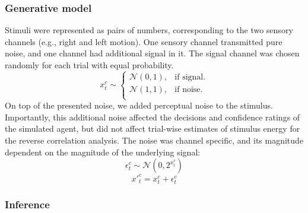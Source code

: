 \documentclass[12pt,twoside]{reedthesis}
\begin{document}
\hypertarget{generative-model}{%
\subsubsection*{Generative model}\label{generative-model}}

Stimuli were represented as pairs of numbers, corresponding to the two sensory channels (e.g., right and left motion). One sensory channel transmitted pure noise, and one channel had additional signal in it. The signal channel was chosen randomly for each trial with equal probability.
\begin{equation}
  x^c_t \sim \begin{cases}
    \mathcal{N}(0,1), & \text{if signal}.\\
    \mathcal{N}(1,1), & \text{if noise}.\\
  \end{cases}
\end{equation}
On top of the presented noise, we added perceptual noise to the stimulus. Importantly, this additional noise affected the decisions and confidence ratings of the simulated agent, but did not affect trial-wise estimates of stimulus energy for the reverse correlation analysis. The noise was channel specific, and its magnitude dependent on the magnitude of the underlying signal:
\begin{equation}
  \epsilon^c_t \sim \mathcal{N}(0,2^{x^c_t})
\end{equation}
\begin{equation}
 x'^c_t= x^c_t+\epsilon^c_t
\end{equation}
\hypertarget{inference}{%
\subsubsection*{Inference}\label{inference}}
\end{document}
